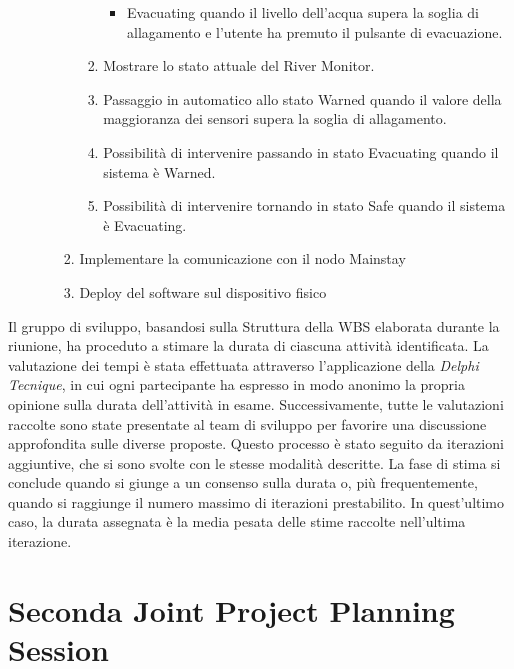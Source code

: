\begin{enumerate}
\begin{enumerate}
\begin{enumerate}
\begin{enumerate}
\begin{itemize}
                                            \item Evacuating quando il livello dell'acqua supera la soglia di allagamento e l'utente ha premuto il pulsante di evacuazione.
                                        \end{itemize}
                                  \item Mostrare lo stato attuale del River Monitor.
                                  \item Passaggio in automatico allo stato Warned quando il valore della maggioranza dei sensori supera la soglia di allagamento.
                                  \item Possibilità di intervenire passando in stato Evacuating quando il sistema è Warned.
                                  \item Possibilità di intervenire tornando in stato Safe quando il sistema è Evacuating.
                              \end{enumerate}
                        \item Implementare la comunicazione con il nodo Mainstay
                        \item Deploy del software sul dispositivo fisico
                    \end{enumerate}
          \end{enumerate}
\end{enumerate}

Il gruppo di sviluppo, basandosi sulla Struttura della WBS elaborata durante la riunione, ha proceduto a stimare la durata di ciascuna attività identificata. La valutazione dei tempi è stata effettuata attraverso l'applicazione della \textit{Delphi Tecnique}, in cui ogni partecipante ha espresso in modo anonimo la propria opinione sulla durata dell'attività in esame. Successivamente, tutte le valutazioni raccolte sono state presentate al team di sviluppo per favorire una discussione approfondita sulle diverse proposte. Questo processo è stato seguito da iterazioni aggiuntive, che si sono svolte con le stesse modalità descritte. La fase di stima si conclude quando si giunge a un consenso sulla durata o, più frequentemente, quando si raggiunge il numero massimo di iterazioni prestabilito. In quest'ultimo caso, la durata assegnata è la media pesata delle stime raccolte nell'ultima iterazione.

\section{Seconda Joint Project Planning Session}

